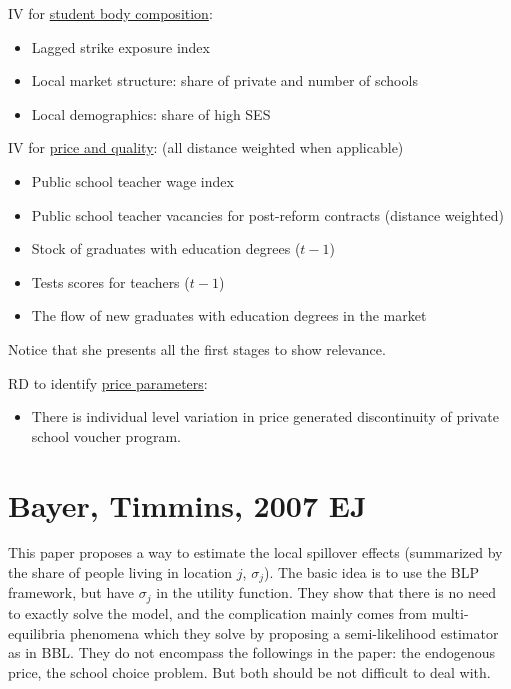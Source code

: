 IV for \underline{student body composition}:
\begin{itemize}
    \item Lagged strike exposure index
    \item Local market structure: share of private and number of schools
    \item Local demographics: share of high SES
\end{itemize}

IV for \underline{price and quality}: (all distance weighted when applicable)
\begin{itemize}
    \item Public school teacher wage index
    \item Public school teacher vacancies for post-reform contracts (distance weighted)
    \item Stock of graduates with education degrees ($t-1$)
    \item Tests scores for teachers ($t-1$)
    \item The flow of new graduates with education degrees in the market
\end{itemize}

Notice that she presents all the first stages to show relevance.

RD to identify \underline{price parameters}:
\begin{itemize}
    \item There is individual level variation in price generated discontinuity of private school voucher program.
\end{itemize}






\section{Bayer, Timmins, 2007 EJ} %
\label{sec:bayer_timmins_2007_ej}

\textbf{}

This paper proposes a way to estimate the local spillover effects (summarized by the share of people living in location $j$, $\sigma_j$).
The basic idea is to use the BLP framework, but have $\sigma_j$ in the utility function.
They show that there is no need to exactly solve the model, and the complication mainly comes from multi-equilibria phenomena which they solve by proposing a semi-likelihood estimator as in BBL.
They do not encompass the followings in the paper: the endogenous price, the school choice problem. But both should be not difficult to deal with.

